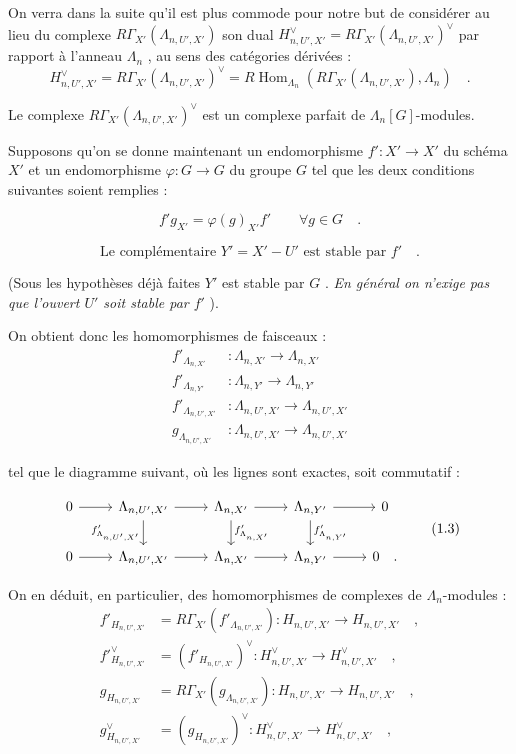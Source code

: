 \documentclass[11pt]{article}
\DeclareMathOperator{\Hom}{Hom}
\providecommand{\Hom}{\operatorname{Hom}}
\providecommand{\La}{\Lambda}
\providecommand{\Hom}{\operatorname{Hom}}
\begin{document}
On verra dans la suite qu'il est plus commode pour notre but de considérer au lieu du complexe $R\Gamma_{X'}(\La_{n,U',X'})$ son dual $H_{n,U',X'}^\vee = R\Gamma_{X'}(\La_{n,U',X'})^\vee$ par rapport à l'anneau $\La_n$ , au sens des catégories dérivées :
\[
H_{n,U',X'}^\vee = R\Gamma_{X'}(\La_{n,U',X'})^\vee = R\Hom_{\La_n}(R\Gamma_{X'}(\La_{n,U',X'}), \La_n) \quad .
\]

Le complexe $R\Gamma_{X'}(\La_{n,U',X'})^\vee$ est un complexe parfait de $\La_n[G]$-modules.

Supposons qu'on se donne maintenant un endomorphisme $f' : X' \to X'$ du schéma $X'$ et un endomorphisme $\varphi : G \to G$ du groupe $G$ tel que les deux conditions suivantes soient remplies :

\begin{equation}\tag{1.1}
f' g_{X'} = \varphi(g)_{X'} f' \qquad \forall g \in G \quad .
\end{equation}

\begin{equation}\tag{1.2}
\text{Le complémentaire } Y' = X' - U' \text{ est stable par } f' \quad .
\end{equation}

(Sous les hypothèses déjà faites $Y'$ est stable par $G$ . \emph{En général on n'exige pas que l'ouvert $U'$ soit stable par $f'$} ).

On obtient donc les homomorphismes de faisceaux :
\begin{align*}
f'_{\La_{n,X'}} &: \La_{n,X'} \longrightarrow \La_{n,X'} \\
f'_{\La_{n,Y'}} &: \La_{n,Y'} \longrightarrow \La_{n,Y'} \\
f'_{\La_{n,U',X'}} &: \La_{n,U',X'} \longrightarrow \La_{n,U',X'} \\
g_{\La_{n,U',X'}} &: \La_{n,U',X'} \longrightarrow \La_{n,U',X'}
\end{align*}

tel que le diagramme suivant, où les lignes sont exactes, soit commutatif :

\[
\begin{tikzcd}
0 \arrow[r] & \La_{n,U',X'} \arrow[r] \arrow[d, "f'_{\La_{n,U',X'}}"'] & \La_{n,X'} \arrow[r] \arrow[d, "f'_{\La_{n,X'}}"] & \La_{n,Y'} \arrow[r] \arrow[d, "f'_{\La_{n,Y'}}"] & 0 \\
0 \arrow[r] & \La_{n,U',X'} \arrow[r] & \La_{n,X'} \arrow[r] & \La_{n,Y'} \arrow[r] & 0 \quad .
\end{tikzcd}
\tag{1.3}
\]

On en déduit, en particulier, des homomorphismes de complexes de $\La_n$-modules :
\begin{align*}
f'_{H_{n,U',X'}} &= R\Gamma_{X'}(f'_{\La_{n,U',X'}}) : H_{n,U',X'} \longrightarrow H_{n,U',X'} \quad , \\
f'^\vee_{H_{n,U',X'}} &= (f'_{H_{n,U',X'}})^\vee : H_{n,U',X'}^\vee \longrightarrow H_{n,U',X'}^\vee \quad , \\
g_{H_{n,U',X'}} &= R\Gamma_{X'}(g_{\La_{n,U',X'}}) : H_{n,U',X'} \longrightarrow H_{n,U',X'} \quad , \\
g^\vee_{H_{n,U',X'}} &= (g_{H_{n,U',X'}})^\vee : H_{n,U',X'}^\vee \longrightarrow H_{n,U',X'}^\vee \quad ,
\end{align*}
\end{document}
